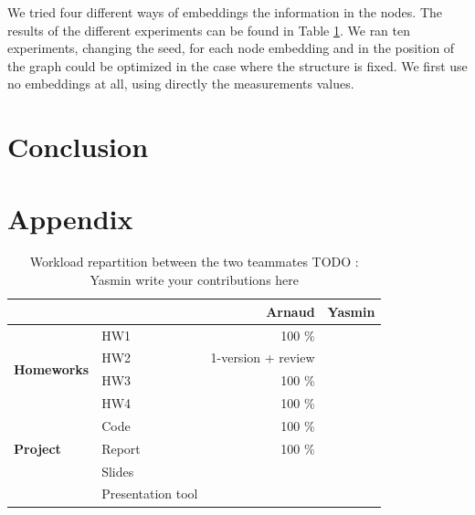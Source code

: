 \documentclass[a4paper,10pt]{article}
\begin{document}
We tried four different ways of embeddings the information in the nodes. The results of the different experiments can be found in Table \ref{tab:nodes}. We ran ten experiments, changing the seed, for each node embedding and in the position of the graph could be optimized in the case where the structure is fixed. We first use no embeddings at all, using directly the measurements values.



\section{Conclusion}



\FloatBarrier
\section{Appendix}
\begin{table}
  \centering
  \begin{tabular}{llrr} \toprule
                                        &                   & \textbf{Arnaud}    & \textbf{Yasmin} \\ \midrule
    \multirow{4}{*}{\textbf{Homeworks}} & HW1               & 100 \%             &                 \\
                                        & HW2               & 1-version + review &                 \\
                                        & HW3               & 100 \%             &                 \\
                                        & HW4               & 100 \%             &                 \\ \cmidrule{2-4}
    \multirow{3}{*}{\textbf{Project}}   & Code              & 100 \%             &                 \\
                                        & Report            & 100 \%             &                 \\
                                        & Slides            &                    &                 \\
                                        & Presentation tool &                    &                 \\
    \bottomrule
  \end{tabular}
  \caption{ Workload repartition between the two teammates \color{red} TODO : Yasmin write your contributions here}
  \label{tab:nodes}
\end{table}
\end{document}

